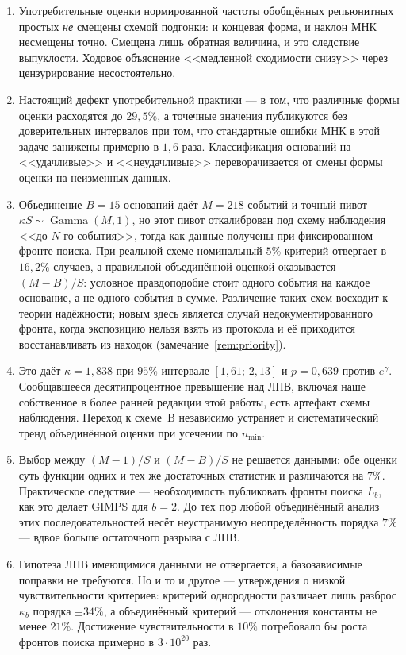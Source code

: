 \documentclass[11pt,a4paper]{article}
\theoremstyle{plain}
\theoremstyle{remark}
\newcommand{\eg}{e^{\gamma}}
\DeclareMathOperator{\Gam}{Gamma}
\begin{document}
\begin{enumerate}
\item Употребительные оценки нормированной частоты обобщённых репьюнитных простых
\emph{не} смещены схемой подгонки: и концевая форма, и наклон МНК несмещены точно.
Смещена лишь обратная величина, и это следствие выпуклости. Ходовое объяснение
<<медленной сходимости снизу>> через цензурирование несостоятельно.

\item Настоящий дефект употребительной практики --- в том, что различные формы оценки
расходятся до $29{,}5\%$, а точечные значения публикуются без доверительных интервалов
при том, что стандартные ошибки МНК в этой задаче занижены примерно в $1{,}6$ раза.
Классификация оснований на <<удачливые>> и <<неудачливые>> переворачивается от смены
формы оценки на неизменных данных.

\item Объединение $B=15$ оснований даёт $M=218$ событий и точный пивот
$\kappa S\sim\Gam(M,1)$, но этот пивот откалиброван под схему наблюдения <<до $N$-го
события>>, тогда как данные получены при фиксированном фронте поиска. При реальной
схеме номинальный $5\%$ критерий отвергает в $16{,}2\%$ случаев, а правильной
объединённой оценкой оказывается $(M-B)/S$: условное правдоподобие стоит
одного события на каждое основание, а не одного события в сумме. Различение
таких схем восходит к теории надёжности; новым здесь является случай
недокументированного фронта, когда экспозицию нельзя взять из протокола и её
приходится восстанавливать из находок (замечание~\ref{rem:priority}).

\item Это даёт $\kappa=1{,}838$ при $95\%$ интервале $[1{,}61;\,2{,}13]$ и
$p=0{,}639$ против $\eg$. Сообщавшееся десятипроцентное превышение над ЛПВ, включая
наше собственное в более ранней редакции этой работы, есть артефакт схемы наблюдения.
Переход к схеме~B независимо устраняет и систематический тренд объединённой оценки
при усечении по $n_{\min}$.

\item Выбор между $(M-1)/S$ и $(M-B)/S$ не решается данными: обе оценки суть функции
одних и тех же достаточных статистик и различаются на $7\%$. Практическое следствие ---
необходимость публиковать фронты поиска $L_b$, как это делает GIMPS для $b=2$.
До тех пор любой объединённый анализ этих последовательностей несёт неустранимую
неопределённость порядка $7\%$ --- вдвое больше остаточного разрыва с ЛПВ.

\item Гипотеза ЛПВ имеющимися данными не отвергается, а базозависимые поправки не
требуются. Но и то и другое --- утверждения о низкой чувствительности критериев:
критерий однородности различает лишь разброс $\kappa_b$ порядка $\pm34\%$, а
объединённый критерий --- отклонения константы не менее $21\%$. Достижение
чувствительности в $10\%$ потребовало бы роста фронтов поиска примерно в $3\cdot10^{20}$ раз.
\end{enumerate}
\end{document}
